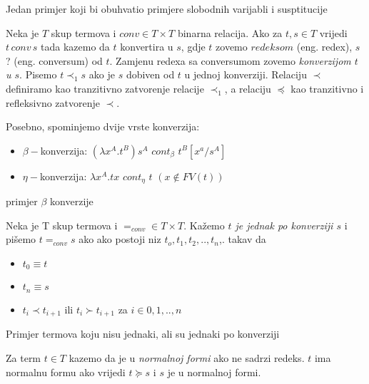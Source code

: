 \begin{primjer}
  Jedan primjer koji bi obuhvatio  primjere slobodnih varijabli i susptitucije
\end{primjer}

\begin{definition}[Konverzija]
  Neka je $T$ skup termova i $conv \in T \times T$ binarna relacija. Ako za $t, s \in T$ vrijedi $t\, conv\, s$ tada kazemo da $t$ konvertira u $s$, gdje $t$ zovemo $redeksom$ (eng. redex), $s$  ? (eng. conversum) od $t$. Zamjenu redexa sa conversumom zovemo \emph{konverzijom $t$ u $s$}. Pisemo $t \prec_1 s$ ako je $s$ dobiven od $t$ u jednoj konverziji. Relaciju $\prec$ definiramo kao tranzitivno zatvorenje relacije $\prec_1$, a relaciju $\preceq$ kao tranzitivno i refleksivno zatvorenje $\prec$.
\end{definition}

Posebno, spominjemo dvije vrste konverzija:
\begin{itemize}
  \item $\beta-$konverzija: $(\lambda x^A . t^B) s^A$ $cont_\beta$ $t^B[x^a/s^A]$
  \item $\eta-$konverzija: $\lambda x^A . t x $ $cont_\eta$ $t$ $(x \not\in FV(t))$
\end{itemize} 

\begin{primjer}
  primjer $\beta$ konverzije
\end{primjer}

\begin{definition}
  Neka je T skup termova i $=_{conv} \in T \times T$. Kažemo \emph{$t$ je jednak po konverziji $s$} i pišemo $t =_{conv} s$ ako ako postoji niz $t_o, t_1, t_2, .., t_n$,. takav da
  \begin{itemize}
    \item $t_0 \equiv t$
    \item $t_n \equiv s$
    \item $t_i \prec t_{i+1}$ ili $t_i \succ t_{i+1}$ za $i \in {0, 1, .., n}$
  \end{itemize}
\end{definition}

\begin{primjer}
  Primjer termova koju nisu jednaki, ali su jednaki po konverziji
\end{primjer}

\begin{definition}
  Za term $t \in T$ kazemo da je u \emph{normalnoj formi} ako ne sadrzi redeks. $t$ ima normalnu formu ako vrijedi $t \succeq s$ i $s$ je u normalnoj formi.
\end{definition}

